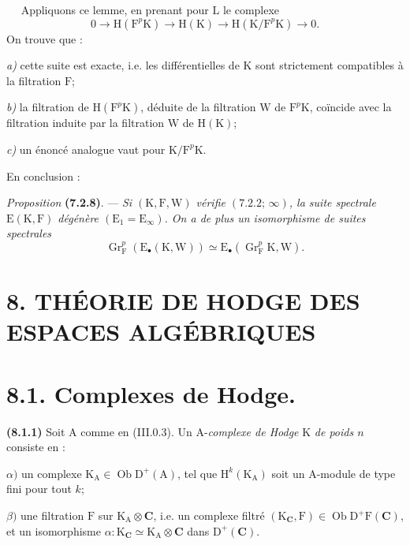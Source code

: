 \documentclass[11pt,leqno]{article}
\newcommand{\Page}[1]{\ifvmode\noindent\else\unskip\ \fi{\footnotesize\textcolor{gray}{[p.\,#1]}}\ \ignorespaces}
\begin{document}
\Page{28}
Appliquons ce lemme, en prenant pour \(\mathrm{L}\) le complexe
\[
0\to\mathrm{H}(\mathrm{F}^p\mathrm{K})
\to\mathrm{H}(\mathrm{K})
\to\mathrm{H}(\mathrm{K}/\mathrm{F}^p\mathrm{K})\to 0.
\]
On trouve que :

\noindent
\textit{a)} cette suite est exacte, i.e. les différentielles de \(\mathrm{K}\) sont strictement compatibles à la filtration \(\mathrm{F}\);

\noindent
\textit{b)} la filtration de \(\mathrm{H}(\mathrm{F}^p\mathrm{K})\), déduite de la filtration \(\mathrm{W}\) de \(\mathrm{F}^p\mathrm{K}\), coïncide avec la filtration induite par la filtration \(\mathrm{W}\) de \(\mathrm{H}(\mathrm{K})\);

\noindent
\textit{c)} un énoncé analogue vaut pour \(\mathrm{K}/\mathrm{F}^p\mathrm{K}\).

En conclusion :

\textit{Proposition} \textbf{(7.2.8)}. — \textit{Si \((\mathrm{K},\mathrm{F},\mathrm{W})\) vérifie \((7.2.2;\,\infty)\), la suite spectrale \(\mathrm{E}(\mathrm{K},\mathrm{F})\) dégénère \((\mathrm{E}_1=\mathrm{E}_{\infty})\). On a de plus un isomorphisme de suites spectrales}
\[
\operatorname{Gr}_{\mathrm{F}}^p(\mathrm{E}_{\bullet}(\mathrm{K},\mathrm{W}))
\simeq\mathrm{E}_{\bullet}(\operatorname{Gr}_{\mathrm{F}}^p\mathrm{K},\mathrm{W}).
\]

\section*{8. THÉORIE DE HODGE DES ESPACES ALGÉBRIQUES}

\section*{8.1. Complexes de Hodge.}

\textbf{(8.1.1)} Soit \(\mathrm{A}\) comme en (III.0.3). Un \(\mathrm{A}\)-\textit{complexe de Hodge} \(\mathrm{K}\) \textit{de poids \(n\)} consiste en :

\noindent
\(\alpha)\) un complexe \(\mathrm{K}_{\mathrm{A}}\in\operatorname{Ob}\mathrm{D}^{+}(\mathrm{A})\), tel que \(\mathrm{H}^{k}(\mathrm{K}_{\mathrm{A}})\) soit un \(\mathrm{A}\)-module de type fini pour tout \(k\);

\noindent
\(\beta)\) une filtration \(\mathrm{F}\) sur \(\mathrm{K}_{\mathrm{A}}\otimes\mathbf{C}\), i.e. un complexe filtré \((\mathrm{K}_{\mathbf{C}},\mathrm{F})\in\operatorname{Ob}\mathrm{D}^{+}\mathrm{F}(\mathbf{C})\), et un isomorphisme \(\alpha:\mathrm{K}_{\mathbf{C}}\simeq\mathrm{K}_{\mathrm{A}}\otimes\mathbf{C}\) dans \(\mathrm{D}^{+}(\mathbf{C})\).
\end{document}
